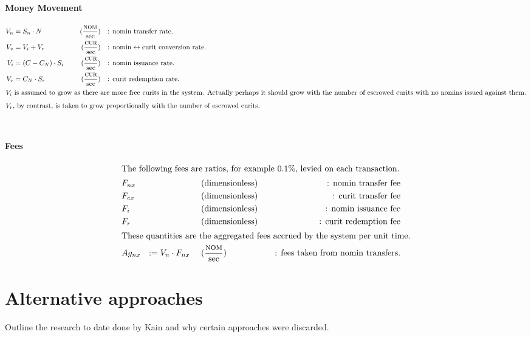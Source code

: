 \documentclass{article}
\begin{document}
\paragraph{Money Movement}
\begin{align*}
    V_n &= S_n \cdot N \ && &(\frac{\textsc{nom}{}}{\text{sec}}) && &\text{: nomin transfer rate.} \\
    V_v &= V_i + V_r \ && &(\frac{\textsc{cur}{}}{\text{sec}}) && &\text{: nomin} \leftrightarrow \text{curit conversion rate.} \\
    V_i &= (C - C_N) \cdot S_i \ && &(\frac{\textsc{cur}{}}{\text{sec}}) && &\text{: nomin issuance rate.} \\
    V_r &= C_N \cdot S_r \ && &(\frac{\textsc{cur}{}}{\text{sec}}) && &\text{: curit redemption rate.} \\
    \intertext{\(V_i\) is assumed to grow as there are more free curits in the system.
               Actually perhaps it should grow with the number of escrowed curits with
               no nomins issued against them.}
    \intertext{\(V_r\), by contrast, is taken to grow proportionally with the number of escrowed curits.}
\end{align*}
\\

\paragraph{Fees}
\begin{align*}
\intertext{The following fees are ratios, for example 0.1\%, levied on each transaction.}
&F_{nx} & \ && &\text{(dimensionless)} && &\text{: nomin transfer fee} \\
&F_{cx} & \ && &\text{(dimensionless)} && &\text{: curit transfer fee} \\
&F_i & \ && &\text{(dimensionless)} && &\text{: nomin issuance fee} \\
&F_r & \ && &\text{(dimensionless)} && &\text{: curit redemption fee} \\
\intertext{These quantities are the aggregated fees accrued by the system per unit time.}
&Ag_{nx} &:= V_n \cdot F_{nx} \ && &(\frac{\textsc{nom}{}}{\text{sec}}) && &\text{: fees taken from nomin transfers.}
\end{align*}

\pagebreak
\section{Alternative approaches}

Outline the research to date done by Kain and why certain approaches were discarded.
\end{document}
